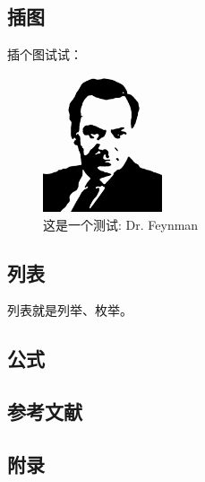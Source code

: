 \subsection{插图}
插个图试试：
\begin{figure}[!h]
	\centering
	\includegraphics[height=4cm]{figures/feynman.png}
	\caption{这是一个测试: Dr. Feynman}\label{fig:feynman}
\end{figure}

\subsection{列表}
列表就是列举、枚举。

\subsection{公式}

\subsection{参考文献}

\subsection{附录}

